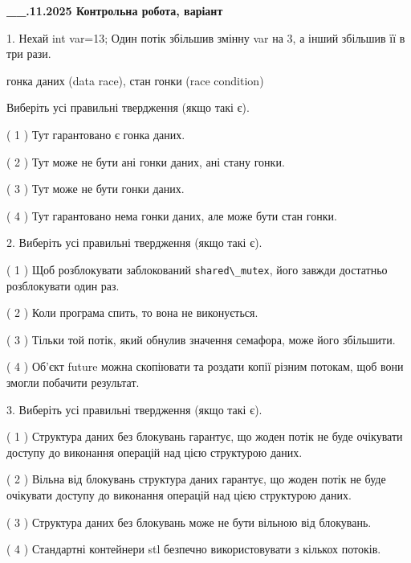\documentclass[12pt, ukrainian]{article}
\def\code#1{\Verb!#1!}
\begin{document}
\newpage
\begin {large}

\textbf{\_\_.11.2025 Контрольна робота, варіант  }\par


{
1. Нехай int var=13; Один потік збільшив змінну var на 3, а інший збільшив її в три рази.

гонка даних (data race), стан гонки (race condition)

Виберіть усі правильні твердження (якщо такі є).\par
\vspace{2mm}
( 1 ) Тут гарантовано є гонка даних.%

( 2 ) Тут може не бути ані гонки даних, ані стану гонки.%

( 3 ) Тут може не бути гонки даних.%

( 4 ) Тут гарантовано нема гонки даних, але може бути стан гонки.%


2. Виберіть усі правильні твердження (якщо такі є).\par
\vspace{2mm}

( 1 ) Щоб розблокувати заблокований \code{shared\_mutex}, його завжди достатньо розблокувати один раз.%

( 2 ) Коли програма спить, то вона не виконується.%

( 3 ) Тільки той потік, який обнулив значення семафора, може його збільшити.%

( 4 ) Об’єкт future можна скопіювати та роздати копії різним потокам, щоб вони змогли побачити результат.%


3. Виберіть усі правильні твердження (якщо такі є).\par
\vspace{2mm}

( 1 ) Структура даних без блокувань гарантує, що жоден потік не буде очікувати доступу до виконання операцій над цією структурою даних.%

( 2 ) Вільна від блокувань структура даних гарантує, що жоден потік не буде очікувати доступу до виконання операцій над цією структурою даних.%

( 3 ) Структура даних без блокувань може не бути вільною від блокувань.%

( 4 ) Стандартні контейнери stl безпечно використовувати з кількох потоків.%


}
\end{large}
\end{document}
